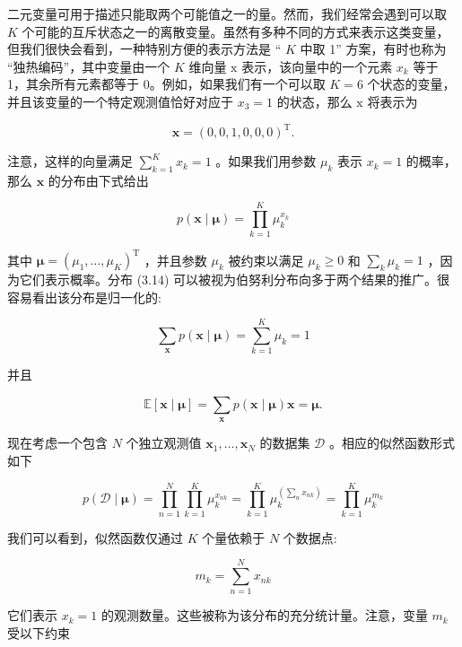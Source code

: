 \documentclass[10pt]{article}
\begin{document}
二元变量可用于描述只能取两个可能值之一的量。然而，我们经常会遇到可以取 \(K\) 个可能的互斥状态之一的离散变量。虽然有多种不同的方式来表示这类变量，但我们很快会看到，一种特别方便的表示方法是 “ \(K\) 中取 1” 方案，有时也称为 “独热编码”，其中变量由一个 \(K\) 维向量 \(\mathrm{x}\) 表示，该向量中的一个元素 \({x}_{k}\) 等于 1，其余所有元素都等于 0。例如，如果我们有一个可以取 \(K = 6\) 个状态的变量，并且该变量的一个特定观测值恰好对应于 \({x}_{3} = 1\) 的状态，那么 \(\mathrm{x}\) 将表示为

\[
\mathbf{x} = {\left( 0,0,1,0,0,0\right) }^{\mathrm{T}}. \tag{3.13}
\]

注意，这样的向量满足 \(\mathop{\sum }\limits_{{k = 1}}^{K}{x}_{k} = 1\) 。如果我们用参数 \({\mu }_{k}\) 表示 \({x}_{k} = 1\) 的概率，那么 \(\mathbf{x}\) 的分布由下式给出

\[
p\left( {\mathbf{x} \mid  \mathbf{\mu }}\right)  = \mathop{\prod }\limits_{{k = 1}}^{K}{\mu }_{k}^{{x}_{k}} \tag{3.14}
\]

其中 \(\mathbf{\mu } = {\left( {\mu }_{1},\ldots ,{\mu }_{K}\right) }^{\mathrm{T}}\) ，并且参数 \({\mu }_{k}\) 被约束以满足 \({\mu }_{k} \geq  0\) 和 \(\mathop{\sum }\limits_{k}{\mu }_{k} = 1\) ，因为它们表示概率。分布 (3.14) 可以被视为伯努利分布向多于两个结果的推广。很容易看出该分布是归一化的:

\[
\mathop{\sum }\limits_{\mathbf{x}}p\left( {\mathbf{x} \mid  \mathbf{\mu }}\right)  = \mathop{\sum }\limits_{{k = 1}}^{K}{\mu }_{k} = 1 \tag{3.15}
\]

并且

\[
\mathbb{E}\left\lbrack  {\mathbf{x} \mid  \mathbf{\mu }}\right\rbrack   = \mathop{\sum }\limits_{\mathbf{x}}p\left( {\mathbf{x} \mid  \mathbf{\mu }}\right) \mathbf{x} = \mathbf{\mu }. \tag{3.16}
\]

现在考虑一个包含 \(N\) 个独立观测值 \({\mathbf{x}}_{1},\ldots ,{\mathbf{x}}_{N}\) 的数据集 \(\mathcal{D}\) 。相应的似然函数形式如下

\[
p\left( {\mathcal{D} \mid  \mathbf{\mu }}\right)  = \mathop{\prod }\limits_{{n = 1}}^{N}\mathop{\prod }\limits_{{k = 1}}^{K}{\mu }_{k}^{{x}_{nk}} = \mathop{\prod }\limits_{{k = 1}}^{K}{\mu }_{k}^{\left( \mathop{\sum }\limits_{n}{x}_{nk}\right) } = \mathop{\prod }\limits_{{k = 1}}^{K}{\mu }_{k}^{{m}_{k}} \tag{3.17}
\]

我们可以看到，似然函数仅通过 \(K\) 个量依赖于 \(N\) 个数据点:

\[
{m}_{k} = \mathop{\sum }\limits_{{n = 1}}^{N}{x}_{nk} \tag{3.18}
\]

它们表示 \({x}_{k} = 1\) 的观测数量。这些被称为该分布的充分统计量。注意，变量 \({m}_{k}\) 受以下约束
\end{document}
